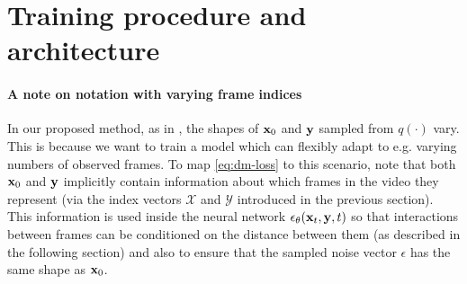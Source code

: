 

\section{Training procedure and architecture}\label{sec:method}

\paragraph{A note on notation with varying frame indices}
In our proposed method, as in \citet{tashiro2021csdi}, the shapes of ${\mathbf{x}}_0$ and ${\mathbf{y}}$ sampled from $q(\cdot)$ vary. This is because we want to train a model which can flexibly adapt to e.g. varying numbers of observed frames. To map \cref{eq:dm-loss} to this scenario, note that both ${\mathbf{x}}_0$ and ${\mathbf{y}}$ implicitly contain information about which frames in the video they represent (via the index vectors $\mathcal{X}$ and $\mathcal{Y}$ introduced in the previous section). This information is used inside the neural network $\epsilon_\theta({\mathbf{x}}_t,{\mathbf{y}}, t)$ so that interactions between frames can be conditioned on the distance between them (as described in the following section) and also to ensure that the sampled noise vector $\epsilon$ has the same shape as ${\mathbf{x}}_0$.



